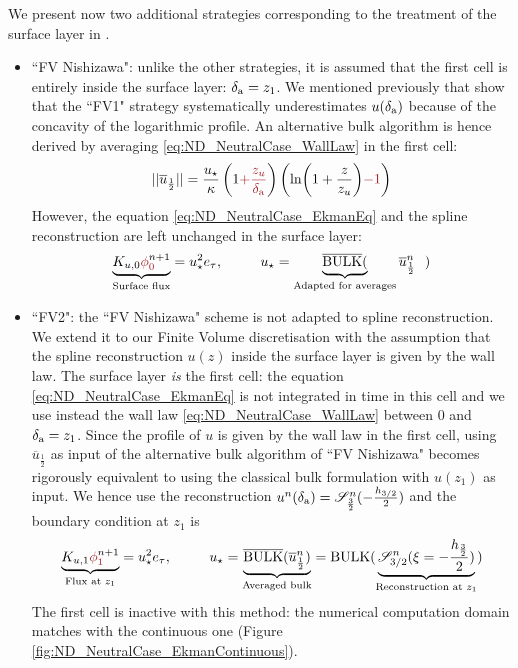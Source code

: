 We present now two additional strategies corresponding to
the treatment of the surface layer in \citep{nishizawa_surface_2018}.
\begin{itemize}
    \item ``FV Nishizawa":  unlike the other strategies,
	    it is assumed that the first cell is entirely inside
		the surface layer: $\delta_{\rm a} = z_{1}$.
		We mentioned previously that
		\citep{nishizawa_surface_2018} show that the ``FV1"
		strategy systematically underestimates
		$u(\delta_{\rm a})$ because of the
	  concavity of the logarithmic profile.
	  An alternative bulk algorithm is hence derived by averaging
		\eqref{eq:ND_NeutralCase_WallLaw} in the first cell:
	\begin{equation}
		||\overline{u}_{\frac{1}{2}}||
		= \frac{u_\star}{\kappa}
		\left(1\emphase{+\frac{z_u}{\delta_{\rm a}}}\right)
		\left(\ln(1+\frac{z}{z_u})\emphase{-1}\right)
	\end{equation}
	However, the equation \eqref{eq:ND_NeutralCase_EkmanEq}
	and the spline reconstruction are left unchanged in the
	surface layer:
		  \begin{equation}
		\underbrace{K_{u,0} \emphase{\phi}^{n+1}_\emphase{0}}_{\text{Surface flux}}
		= u_\star^2 e_\tau, ~~~~~~~~
			  u_\star = \underbrace{\overline{{\rm BULK}}(}_{
				  \text{Adapted for averages}}
			  \overline{u}^{n}_{\frac{1}{2}}~~)
		  \end{equation}
	\item ``FV2": the ``FV Nishizawa" scheme is not adapted to
		spline reconstruction. We extend it to our
		Finite Volume discretisation with the assumption
		that the spline reconstruction $u(z)$ inside
		the surface layer is given by the wall law.
	    The surface layer \textit{is} the first cell:
	    the equation \eqref{eq:ND_NeutralCase_EkmanEq}
	    is not integrated in time in this cell
	and we use instead the wall law
	\eqref{eq:ND_NeutralCase_WallLaw} between 0 and
		$\delta_{\rm a} = z_1$.
	Since the profile of $u$ is given by the wall law
	in the first cell,
	using $\overline{u}_{\frac{1}{2}}$ as input of
	the alternative bulk algorithm of ``FV Nishizawa"
	becomes rigorously equivalent to using the
	classical bulk formulation with $u(z_1)$
	as input.
	We hence use the reconstruction
	$u^n(\delta_{\rm a}) = {\cal S}^n_{\frac{3}{2}}(
	  -\frac{h_{3/2}}{2})$ and the boundary condition
		  at $z_1$ is
	  \begin{equation}
		\underbrace{K_{u,1} \emphase{\phi}^{n+1}_\emphase{1}}_{\text{Flux at } z_1}
		= u_\star^2 e_\tau, ~~~~~~~~
			  u_\star = \underbrace{\overline{{\rm BULK}}(
			  \overline{u}^{n}_{\frac{1}{2}})}_{
				  \text{Averaged bulk}
			  } = {\rm BULK}(
			\underbrace{{\cal S}_{3/2}^{n}
			(\xi=-\frac{h_{\frac{3}{2}}}{2})}_{
				\text{Reconstruction at }
			z_{1}})
		  \end{equation}
	The first cell is inactive with this method:
	the numerical computation domain matches with the continuous
	one (Figure \ref{fig:ND_NeutralCase_EkmanContinuous}).
  \end{itemize}
